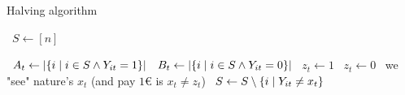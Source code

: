\begin{algorithm}
    \caption{Halving algorithm}\label{alg:halving}
    \begin{algorithmic}%
            \State~$S \gets [n]$

                \State~$A_t \gets \vert  \{ i \; \vert \; i \in S \wedge Y_{it} = 1 \}  \vert$
                \State~$B_t \gets \vert  \{ i \; \vert \; i \in S \wedge Y_{it} = 0 \}  \vert$
                    \State~$z_t \gets 1$
                \Else
                    \State~$z_t \gets 0$
                \EndIf
                \State~we "see" nature's $x_t$ (and pay $1$€ is $x_t \neq z_t$)
                \State~$S \gets S \setminus \{ i \; \vert \; Y_{it} \neq x_t \}$
            \EndFor
    \end{algorithmic}
\end{algorithm}